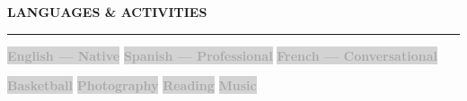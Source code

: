 \documentclass[9pt,a4paper]{article}
\newcommand{\cvsection}[1]{%
  \vspace{4pt}
  {\normalsize\textbf{\textcolor{accent}{\uppercase{#1}}}}\\[-5pt]
  {\color{accent}\rule{\linewidth}{1.0pt}}
  \vspace{1pt}
}
\newcommand{\skilltag}[1]{%
  \colorbox{lightgray}{\scriptsize\textcolor{darkgray}{\textbf{#1}}}%
  \hspace{1pt}%
}
\begin{document}
\cvsection{Languages \& Activities}
\begin{minipage}[t]{0.48\linewidth}
  \skilltag{English — Native}\hspace{3pt}
  \skilltag{Spanish — Professional}\hspace{3pt}
  \skilltag{French — Conversational}
\end{minipage}%
\hfill
\begin{minipage}[t]{0.48\linewidth}
  \skilltag{Basketball}\hspace{2pt}
  \skilltag{Photography}\hspace{2pt}
  \skilltag{Reading}\hspace{2pt}
  \skilltag{Music}
\end{minipage}
\end{document}
